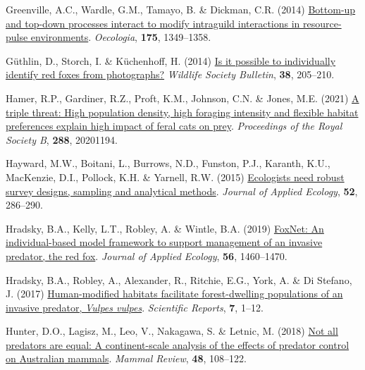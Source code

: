 \documentclass[preprint, 3p, authoryear]{elsarticle} %
\newlength{\cslhangindent}
\newlength{\cslentryspacingunit} %
\newenvironment{CSLReferences}[2] %
 {%
  \setlength{\parindent}{0pt}
  \ifodd #1
  \let\oldpar\par
  \def\par{\hangindent=\cslhangindent\oldpar}
  \fi
  \setlength{\parskip}{#2\cslentryspacingunit}
 }%
 {}
\begin{document}
\begin{CSLReferences}{1}{0}
\leavevmode{}%
Greenville, A.C., Wardle, G.M., Tamayo, B. \& Dickman, C.R. (2014) \href{https://doi.org/10.1007/s00442-014-2977-8}{Bottom-up and top-down processes interact to modify intraguild interactions in resource-pulse environments}. \emph{Oecologia}, \textbf{175}, 1349--1358.

\leavevmode{}%
Güthlin, D., Storch, I. \& Küchenhoff, H. (2014) \href{https://doi.org/10.1002/wsb.377}{Is it possible to individually identify red foxes from photographs?} \emph{Wildlife Society Bulletin}, \textbf{38}, 205--210.

\leavevmode{}%
Hamer, R.P., Gardiner, R.Z., Proft, K.M., Johnson, C.N. \& Jones, M.E. (2021) \href{https://doi.org/10.1098/rspb.2020.1194}{A triple threat: High population density, high foraging intensity and flexible habitat preferences explain high impact of feral cats on prey}. \emph{Proceedings of the Royal Society B}, \textbf{288}, 20201194.

\leavevmode{}%
Hayward, M.W., Boitani, L., Burrows, N.D., Funston, P.J., Karanth, K.U., MacKenzie, D.I., Pollock, K.H. \& Yarnell, R.W. (2015) \href{https://doi.org/10.1111/1365-2664.12408}{Ecologists need robust survey designs, sampling and analytical methods}. \emph{Journal of Applied Ecology}, \textbf{52}, 286--290.

\leavevmode{}%
Hradsky, B.A., Kelly, L.T., Robley, A. \& Wintle, B.A. (2019) \href{https://doi.org/10.1111/1365-2664.13374}{FoxNet: An individual-based model framework to support management of an invasive predator, the red fox}. \emph{Journal of Applied Ecology}, \textbf{56}, 1460--1470.

\leavevmode{}%
Hradsky, B.A., Robley, A., Alexander, R., Ritchie, E.G., York, A. \& Di Stefano, J. (2017) \href{https://doi.org/10.1038/s41598-017-12464-7}{Human-modified habitats facilitate forest-dwelling populations of an invasive predator, \emph{{V}ulpes vulpes}}. \emph{Scientific Reports}, \textbf{7}, 1--12.

\leavevmode{}%
Hunter, D.O., Lagisz, M., Leo, V., Nakagawa, S. \& Letnic, M. (2018) \href{https://doi.org/10.1111/mam.12115}{Not all predators are equal: A continent-scale analysis of the effects of predator control on {{A}ustralian} mammals}. \emph{Mammal Review}, \textbf{48}, 108--122.


\end{CSLReferences}
\end{document}
